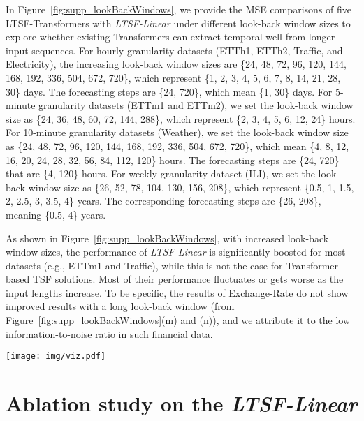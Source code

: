 \documentclass[10pt,twocolumn,letterpaper]{article}
\newcommand{\modelname}{\emph{LTSF-Linear}\xspace}
\begin{document}
In Figure~\ref{fig:supp_lookBackWindows}, we provide the MSE comparisons of five LTSF-Transformers with \modelname under different look-back window sizes to explore whether existing Transformers can extract temporal well from longer input sequences. 
For hourly granularity datasets (ETTh1, ETTh2, Traffic, and Electricity), the increasing look-back window sizes are \{24, 48, 72, 96, 120, 144, 168, 192, 336, 504, 672, 720\}, which represent \{1, 2, 3, 4, 5, 6, 7, 8, 14, 21, 28, 30\} days. The forecasting steps are \{24, 720\}, which mean \{1, 30\} days. For 5-minute granularity datasets (ETTm1 and ETTm2), we set the look-back window size as \{24, 36, 48, 60, 72, 144, 288\}, which represent \{2, 3, 4, 5, 6, 12, 24\} hours. For 10-minute granularity datasets (Weather), we set the look-back window size as \{24, 48, 72, 96, 120, 144, 168, 192, 336, 504, 672, 720\}, which mean \{4, 8, 12, 16, 20, 24, 28, 32, 56, 84, 112, 120\} hours. The forecasting steps are \{24, 720\} that are \{4, 120\} hours. For weekly granularity dataset (ILI), we set the look-back window size as \{26, 52, 78, 104, 130, 156, 208\}, which represent \{0.5, 1, 1.5, 2, 2.5, 3, 3.5, 4\} years. The corresponding forecasting steps are \{26, 208\}, meaning \{0.5, 4\} years.

As shown in Figure~\ref{fig:supp_lookBackWindows}, with increased look-back window sizes, the performance of \modelname is significantly boosted for most datasets (e.g., ETTm1 and Traffic), while this is not the case for Transformer-based TSF solutions. Most of their performance fluctuates or gets worse as the input lengths increase. To be specific, the results of Exchange-Rate do not show improved results with a long look-back window (from Figure~\ref{fig:supp_lookBackWindows}(m) and (n)), and we attribute it to the low information-to-noise ratio in such financial data.


\begin{figure*}[h]
\begin{center}
\texttt{[image: img/viz.pdf]}
\end{center}
\caption{Visualization of the weights(T*L) of \modelname on several benchmarks. Models are trained with a look-back window L (X-axis) and different forecasting time steps T (Y-axis). We show weights in the remainder and trend layer.}
\label{fig:viz}
\end{figure*}

\section{Ablation study on the \modelname}
\label{sec:supp_lookback}
\end{document}
